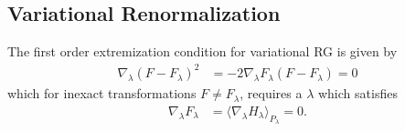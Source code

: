 \documentclass{article}
\theoremstyle{remark}
\theoremstyle{definition}
\begin{document}
\subsection*{Variational Renormalization}

The first order extremization condition for variational RG is given by
\begin{align}
    \nabla_\lambda (F - F_\lambda)^2 &= -2 \nabla_\lambda F_\lambda (F - F_\lambda) = 0
\end{align}
which for inexact transformations $F \not= F_\lambda$, requires a $\lambda$ which satisfies
\begin{align}
    \nabla_\lambda F_\lambda &= \langle \nabla_\lambda H_\lambda \rangle_{P_\lambda} = 0.
\end{align}

\medskip



\end{document}
